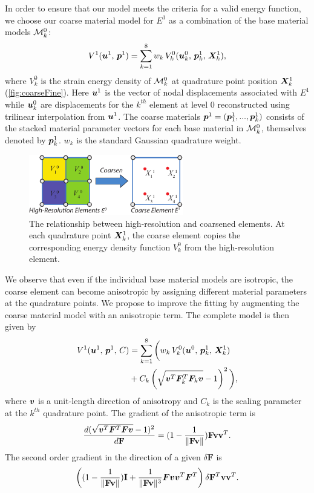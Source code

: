 In order to ensure that our model meets the criteria for a valid energy function, we choose our coarse material model for $\mathit{E}^1$ as a combination of the base material models $\mathcal{M}_k^0$:
\begin{align}
V^1(\bm{u}^1, \, \bm{p}^1) = \sum_{k=1}^8 w_k \, V_k^0(\bm{u}_k^0, \, \bm{p}_k^1, \, \bm{X}_k^1),
\label{eq:materialModel}
\end{align}
where $V_k^0$ is the strain energy density of $\mathcal{M}_k^0$ at quadrature point position $\bm{X}_k^1$ (\autoref{fig:coarseFine}). Here $\bm{u}^1$ is the vector of nodal displacements associated with $\mathit{E}^1$ while $\bm{u}_k^0$ are displacements for the $k^{th}$ element at level $0$ reconstructed using trilinear interpolation from $\bm{u}^1$.
The coarse materials $\bm{p}^1=(\bm{p}_1^1,...,\bm{p}_k^1)$ consists of the stacked material parameter vectors for each base material in $\mathcal{M}_k^0$, themselves denoted by $\bm{p}_k^1$.  $w_k$ is the standard Gaussian quadrature weight.
\begin{figure}
	\centering
	\includegraphics[width=0.6\textwidth]{images/coarseFine.pdf}
	\caption{The relationship between high-resolution and coarsened elements. At each quadrature point $\bm{X}_k^1$, the coarse element copies the corresponding energy density function $V_k^0$ from the high-resolution element.}
	\label{fig:coarseFine}
\end{figure}
We observe that even if the individual base material models are isotropic, the coarse element can become anisotropic by assigning different material parameters at the quadrature points.
We propose to improve the fitting by augmenting the coarse material model with an anisotropic term.
The complete model is then given by
\begin{align}
\begin{split}
V^1(\bm{u}^1, \, \bm{p}^1, \, C) &= \sum_{k=1}^8 \bigg( w_k \, V_k^0(\bm{u}^0, \,\bm{p}_k^1, \, \bm{X}_k^1)\\
& + C_k\left( \sqrt{\bm{v}^T\bm{F}_k^T\bm{F}_k\bm{v}} - 1\right)^2\bigg),\\
\label{eq:materialModel2}
\end{split}
\end{align}
where $\bm{v}$ is a unit-length direction of anisotropy and $C_k$ is the scaling parameter at the $k^{th}$ quadrature point. 
The gradient of the anisotropic term is
\[
\frac{d( \sqrt{\bm{v}^T\bm{F}^T\bm{F}\bm{v}} - 1)^2}{d\mathbf{F}}
=(1-\frac{1}{\|\mathbf{F}\mathbf{v}\|})\mathbf{F}\mathbf{v}\mathbf{v}^T.
\]
The second order gradient in the direction of a given $\delta \mathbf{F}$ is
\[
\left((1-\frac{1}{\|\mathbf{F}\mathbf{v}\|})\mathbf{I} 
+ \frac{1}{\|\mathbf{F}\mathbf{v}\|^3}\bm{F}\bm{v}\bm{v}^T\bm{F}^T\right)\delta\mathbf{F}^T\mathbf{v}\mathbf{v}^T.
\]
